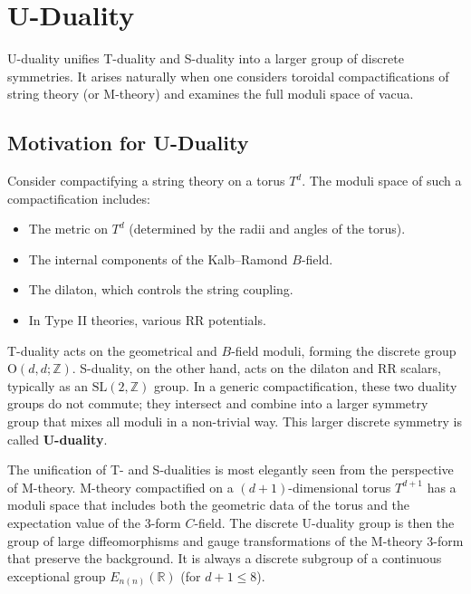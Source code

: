 \documentclass[11pt]{article}
\begin{document}
\section{U-Duality}
U-duality unifies T-duality and S-duality into a larger group of discrete symmetries. It arises naturally when one considers toroidal compactifications of string theory (or M-theory) and examines the full moduli space of vacua.

\subsection{Motivation for U-Duality}
Consider compactifying a string theory on a torus $T^d$. The moduli space of such a compactification includes:
\begin{itemize}
    \item The metric on $T^d$ (determined by the radii and angles of the torus).
    \item The internal components of the Kalb--Ramond $B$-field.
    \item The dilaton, which controls the string coupling.
    \item In Type II theories, various RR potentials.
\end{itemize}
T-duality acts on the geometrical and $B$-field moduli, forming the discrete group $\mathrm{O}(d,d;\mathbb{Z})$. S-duality, on the other hand, acts on the dilaton and RR scalars, typically as an $\mathrm{SL}(2,\mathbb{Z})$ group. In a generic compactification, these two duality groups do not commute; they intersect and combine into a larger symmetry group that mixes all moduli in a non-trivial way. This larger discrete symmetry is called \textbf{U-duality}.

The unification of T- and S-dualities is most elegantly seen from the perspective of M-theory. M-theory compactified on a $(d+1)$-dimensional torus $T^{d+1}$ has a moduli space that includes both the geometric data of the torus and the expectation value of the 3-form $C$-field. The discrete U-duality group is then the group of large diffeomorphisms and gauge transformations of the M-theory 3-form that preserve the background. It is always a discrete subgroup of a continuous exceptional group $E_{n(n)}(\mathbb{R})$ (for $d+1 \leq 8$).
\end{document}
